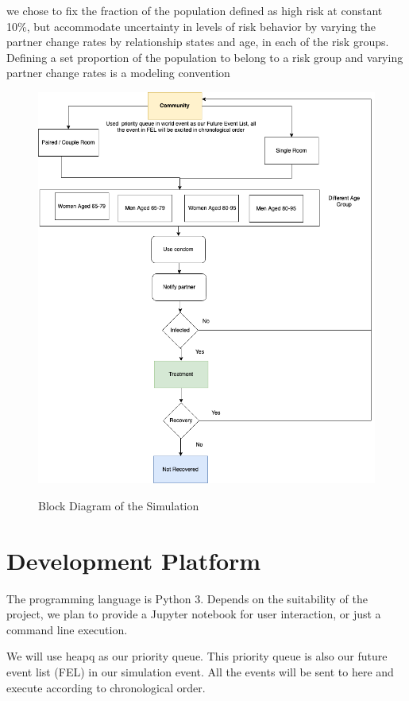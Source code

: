 \documentclass{article}
\begin{document}
\begin{normalsize}
   	we chose to fix the fraction of the population defined as high risk at constant 10\%, but accommodate uncertainty in levels of risk behavior by varying the partner change rates by relationship states and age, in each of the risk groups. Defining a set proportion of the population to belong to a risk group and varying partner change rates is a modeling convention

\begin{figure}[H]
\caption{Block Diagram of  the Simulation}
\centering
\includegraphics[width=1\textwidth]{BlockDiagram.png}
\label{fig:blockDiagram}
\end{figure}


    \section{Development Platform}
    The programming language is Python $3$. Depends on the suitability of the project, we plan to provide a Jupyter notebook for user interaction, or just a command line execution.
    
    We will use heapq as our priority queue. This priority queue is also our future event list (FEL) in our simulation event. All the events will be sent to here and execute according to chronological order.
     

\end{normalsize}
\end{document}

